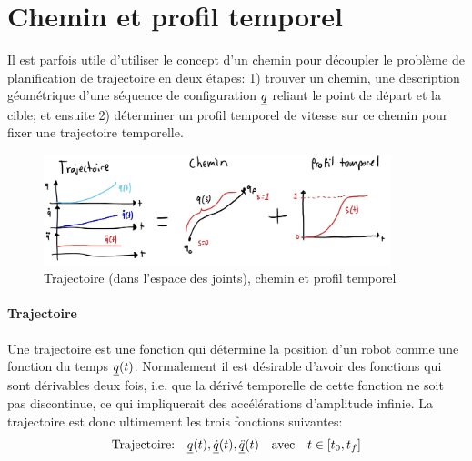 


\section{Chemin et profil temporel}
\label{sec:chemin}


Il est parfois utile d'utiliser le concept d'un chemin pour découpler le problème de planification de trajectoire en deux étapes: 1) trouver un chemin, une description géométrique d'une séquence de configuration $\underline{q}$ reliant le point de départ et la cible; et ensuite 2) déterminer un profil temporel de vitesse sur ce chemin pour fixer une trajectoire temporelle.

\begin{figure}[htbp]
	\centering
		\includegraphics[width=0.90\textwidth]{fig/traj_path.jpg}
	\caption{Trajectoire (dans l'espace des joints), chemin et profil temporel}
	\label{fig:traj_path}
\end{figure}

\paragraph{Trajectoire} Une trajectoire est une fonction qui détermine la position d'un robot comme une fonction du temps $\underline{q}(t)$. Normalement il est désirable d'avoir des fonctions qui sont dérivables deux fois, i.e. que la dérivé temporelle de cette fonction ne soit pas discontinue, ce qui impliquerait des accélérations d'amplitude infinie. La trajectoire est donc ultimement les trois fonctions suivantes:
\begin{align}
    \text{Trajectoire:} \quad \underline{q}(t), \underline{\dot{q}}(t), \underline{\ddot{q}}(t) \quad \text{avec} \quad t \in [t_0,t_f]
\end{align}

